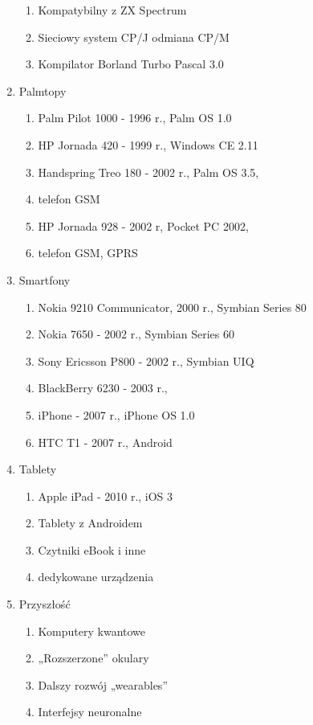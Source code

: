 \documentclass[a4paper,twoside,onecolumn]{report}
\begin{document}
\begin{enumerate}[-]
\begin{enumerate}[*]
					\item Kompatybilny z ZX Spectrum
					\item Sieciowy system CP/J odmiana CP/M
					\item Kompilator Borland Turbo Pascal 3.0
				\end{enumerate}
			\item Palmtopy
				\begin{enumerate}[*]
					\item Palm Pilot 1000 - 1996 r., Palm OS 1.0
					\item HP Jornada 420 - 1999 r., Windows CE 2.11
					\item Handspring Treo 180 - 2002 r., Palm OS 3.5,
					\item telefon GSM
					\item HP Jornada 928 - 2002 r, Pocket PC 2002,
					\item telefon GSM, GPRS
				\end{enumerate}
			\item Smartfony
				\begin{enumerate}[*]
					\item Nokia 9210 Communicator, 2000 r., Symbian Series 80
					\item Nokia 7650 - 2002 r., Symbian Series 60
					\item Sony Ericsson P800 - 2002 r., Symbian UIQ
					\item BlackBerry 6230 - 2003 r.,
					\item iPhone - 2007 r., iPhone OS 1.0
					\item HTC T1 - 2007 r., Android
				\end{enumerate}
			\item Tablety
				\begin{enumerate}[*]
					\item Apple iPad - 2010 r., iOS 3
					\item Tablety z Androidem
					\item Czytniki eBook i inne
					\item dedykowane urządzenia
				\end{enumerate}
			\item Przyszłość
				\begin{enumerate}[*]
					\item Komputery kwantowe
					\item „Rozszerzone” okulary
					\item Dalszy rozwój „wearables”
					\item Interfejsy neuronalne
				\end{enumerate}
		\end{enumerate}
\end{document}
